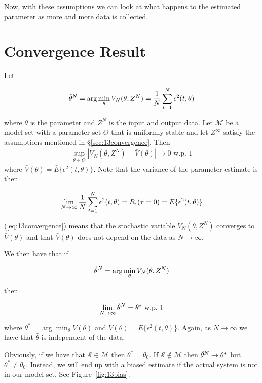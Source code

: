 Now, with these assumptions we can look at what happens to the estimated parameter as more and more data is collected.

\section{Convergence Result}%
\label{sec:convergence}
Let

\begin{equation*}
\hat{\theta}^N = \arg\min_\theta V_N(\theta,Z^N) = \frac{1}{N}\sum_{t=1}^N\epsilon^2(t,\theta)
\end{equation*}

where $\theta$ is the parameter and $Z^N$ is the input and output data.
Let $\mathcal{M}$ be a model set with a parameter set $\Theta$ that is uniformly stable and let $Z^\infty$ satisfy the assumptions mentioned in \S\ref{sec:13convergence}.
Then
\begin{align}
\label{eq:13convergence}
\sup_{\theta\in\Theta}\left|V_N(\theta,Z^N)-\bar{V}(\theta)\right| \to 0 \text{~w.p.~} 1
\end{align}
where $\bar{V}(\theta)=\bar{E}\{\epsilon^2(t,\theta)\}$.
Note that the variance of the parameter estimate is then

\begin{equation*}
\lim_{N\to\infty}\frac{1}{N}\sum_{t=1}^N\epsilon^2(t,\theta) = R_\epsilon(\tau=0) = E\{\epsilon^2(t,\theta)\}
\end{equation*}

(\ref{eq:13convergence}) means that the stochastic variable $V_N(\theta,Z^N)$ converges to $\bar{V}(\theta)$ and that $\bar{V}(\theta)$ does not depend on the data as $N\to\infty$.

We then have that if

\begin{equation*}
\hat{\theta}^N = \arg\min_\theta V_N(\theta,Z^N)
\end{equation*}

then

\begin{equation*}
\lim_{N\to\infty}\hat{\theta}^N = \theta^\ast \text{~w.p.~} 1
\end{equation*}

where $\theta^\ast = \arg\min_\theta \bar{V}(\theta)$ and $\bar{V}(\theta) = E\{\epsilon^2(t,\theta)\}$.
Again, as $N\to\infty$ we have that $\hat{\theta}$ is independent of the data.

Obviously, if we have that $\mathcal{S}\in\mathcal{M}$ then $\theta^\ast=\theta_0$.
If $\mathcal{S}\notin\mathcal{M}$ then $\hat{\theta}^N\to\theta^\ast$ but $\theta^\ast\neq\theta_0$.
Instead, we will end up with a biased estimate if the actual system is not in our model set.
See Figure~\ref{fig:13bias}.

